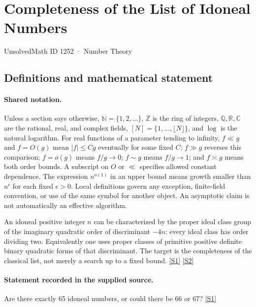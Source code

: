\documentclass[11pt,a4paper]{article}
\newcommand{\N}{\mathbb{N}}
\newcommand{\Z}{\mathbb{Z}}
\newcommand{\Q}{\mathbb{Q}}
\newcommand{\R}{\mathbb{R}}
\newcommand{\C}{\mathbb{C}}
\newcommand{\sref}[2]{\hyperlink{source:#1:#2}{[S#2]}}
\begin{document}

\setcounter{section}{1251}

\section{Completeness of the List of Idoneal Numbers}\label{1252}

{\small\sffamily UnsolvedMath ID 1252 · Number Theory}

\subsection{Definitions and mathematical statement}

\paragraph{Shared notation.}Unless a section says otherwise, $\N=\{1,2,\ldots\}$,
$\Z$ is the ring of integers, $\Q,\R,\C$ are the rational, real, and complex
fields, $[N]=\{1,\ldots,\lfloor N\rfloor\}$, and $\log$ is the natural
logarithm. For real functions of a parameter tending to infinity,
$f\ll g$ and $f=O(g)$ mean $|f|\leq Cg$ eventually for some fixed $C$;
$f\gg g$ reverses this comparison; $f=o(g)$ means $f/g\to0$;
$f\sim g$ means $f/g\to1$; and $f\asymp g$ means both order bounds.
A subscript on $O$ or $\ll$ specifies allowed constant dependence.
The expression $n^{o(1)}$ in an upper bound means growth smaller than
$n^\epsilon$ for each fixed $\epsilon>0$. Local definitions govern any
exception, finite-field convention, or use of the same symbol for another
object. An asymptotic claim is not automatically an effective algorithm.



An idoneal positive integer $n$ can be characterized by the proper ideal class group of the imaginary quadratic order of discriminant $-4n$: every ideal class has order dividing two. Equivalently one uses proper classes of primitive positive definite binary quadratic forms of that discriminant. The target is the completeness of the classical list, not merely a search up to a fixed bound. \sref{1252}{1} \sref{1252}{2}

\paragraph{Statement recorded in the supplied source.}
Are there exactly 65 idoneal numbers, or could there be 66 or 67? \sref{1252}{1}
\end{document}
